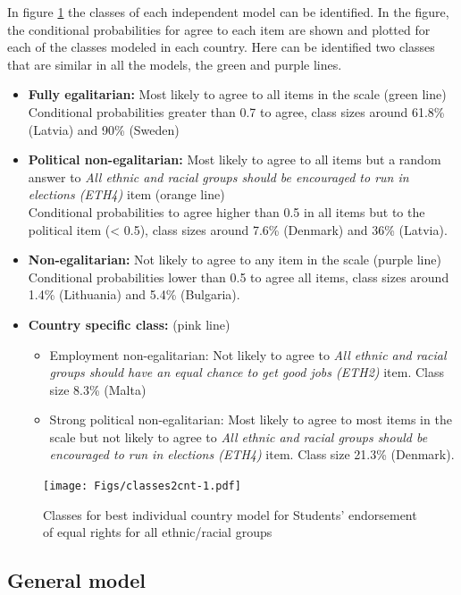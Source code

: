 \documentclass[12pt,a4paper,oneside]{reedthesis}
\providecommand{\tightlist}{%
  \setlength{\itemsep}{0pt}\setlength{\parskip}{0pt}}
\begin{document}
In figure \ref{fig:classes2cnt} the classes of each independent model can be identified. In the figure, the conditional probabilities for agree to each item are shown and plotted for each of the classes modeled in each country. Here can be identified two classes that are similar in all the models, the green and purple lines.
\begin{itemize}
\item
  \textbf{Fully egalitarian:} Most likely to agree to all items in the scale (green line)\\
  Conditional probabilities greater than 0.7 to agree, class sizes around 61.8\% (Latvia) and 90\% (Sweden)
\item
  \textbf{Political non-egalitarian:} Most likely to agree to all items but a random answer to \emph{All ethnic and racial groups should be encouraged to run in elections (ETH4)} item (orange line)\\
  Conditional probabilities to agree higher than 0.5 in all items but to the political item (\textless{} 0.5), class sizes around 7.6\% (Denmark) and 36\% (Latvia).
\item
  \textbf{Non-egalitarian:} Not likely to agree to any item in the scale (purple line)\\
  Conditional probabilities lower than 0.5 to agree all items, class sizes around 1.4\% (Lithuania) and 5.4\% (Bulgaria).
\item
  \textbf{Country specific class:} (pink line)
  \begin{itemize}
  \tightlist
  \item
    Employment non-egalitarian: Not likely to agree to \emph{All ethnic and racial groups should have an equal chance to get good jobs (ETH2)} item. Class size 8.3\% (Malta)
  \item
    Strong political non-egalitarian: Most likely to agree to most items in the scale but not likely to agree to \emph{All ethnic and racial groups should be encouraged to run in elections (ETH4)} item. Class size 21.3\% (Denmark).
  \end{itemize}
\end{itemize}
\begin{figure}
\centering
\texttt{[image: Figs/classes2cnt-1.pdf]}
\caption{\label{fig:classes2cnt}Classes for best individual country model for Students' endorsement of equal rights for all ethnic/racial groups}
\end{figure}
\newpage

\hypertarget{general-model-1}{%
\subsection{General model}\label{general-model-1}}
\end{document}
